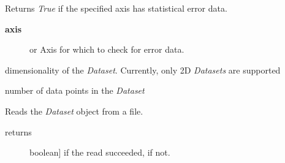 \documentclass[a4paper,10pt,english]{sphinxmanual}
\begin{document}
\begin{fulllineitems}
\begin{fulllineitems}
\begin{description}
\end{description}

\end{fulllineitems}


\begin{fulllineitems}
\label{index:kafe.dataset.Dataset.has_errors}
Returns \emph{True} if the specified axis has statistical error data.
\begin{description}
\item[{\textbf{axis}}] \leavevmode{[} or \code{'y'}{]}
Axis for which to check for error data.

\end{description}

\end{fulllineitems}


\begin{fulllineitems}
\label{index:kafe.dataset.Dataset.n_axes}
dimensionality of the \emph{Dataset}. Currently, only 2D \emph{Datasets} are
supported

\end{fulllineitems}


\begin{fulllineitems}
\label{index:kafe.dataset.Dataset.n_datapoints}
number of data points in the \emph{Dataset}

\end{fulllineitems}


\begin{fulllineitems}
\label{index:kafe.dataset.Dataset.read_from_file}
Reads the \emph{Dataset} object from a file.
\begin{description}
\item[{returns}] \leavevmode{[}boolean{]}
 if the read succeeded,  if not.

\end{description}


\end{fulllineitems}
\end{fulllineitems}
\end{document}
